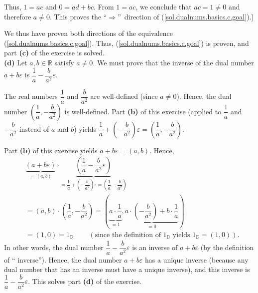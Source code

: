 \documentclass[paper=a4, fontsize=12pt]{scrartcl}%
\theoremstyle{plainsl}
\theoremstyle{definition}
\theoremstyle{remark}
\begin{document}
Thus, $1=ac$ and $0=ad+bc$. From $1=ac$, we conclude that $ac=1\neq0$ and
therefore $a\neq0$. This proves the \textquotedblleft$\Longrightarrow
$\textquotedblright\ direction of (\ref{sol.dualnums.basics.c.goal}).]

We thus have proven both directions of the equivalence
(\ref{sol.dualnums.basics.c.goal}). Thus, (\ref{sol.dualnums.basics.c.goal})
is proven, and part \textbf{(c)} of the exercise is solved.\\[0.4cm]

\textbf{(d)} Let $a,b\in\mathbb{R}$ satisfy $a\neq0$. We must prove that the
inverse of the dual number $a+b\varepsilon$ is $\dfrac{1}{a}-\dfrac{b}{a^{2}%
}\varepsilon$.

The real numbers $\dfrac{1}{a}$ and $\dfrac{b}{a^{2}}$ are well-defined (since
$a\neq0$). Hence, the dual number $\left(  \dfrac{1}{a},-\dfrac{b}{a^{2}%
}\right)  $ is well-defined. Part \textbf{(b)} of this exercise (applied to
$\dfrac{1}{a}$ and $-\dfrac{b}{a^{2}}$ instead of $a$ and $b$) yields
$\dfrac{1}{a}+\left(  -\dfrac{b}{a^{2}}\right)  \varepsilon=\left(  \dfrac
{1}{a},-\dfrac{b}{a^{2}}\right)  $.

Part \textbf{(b)} of this exercise yields $a+b\varepsilon=\left(  a,b\right)
$. Hence,%
\begin{align*}
&  \underbrace{\left(  a+b\varepsilon\right)  }_{=\left(  a,b\right)  }%
\cdot\underbrace{\left(  \dfrac{1}{a}-\dfrac{b}{a^{2}}\varepsilon\right)
}_{=\dfrac{1}{a}+\left(  -\dfrac{b}{a^{2}}\right)  \varepsilon=\left(
\dfrac{1}{a},-\dfrac{b}{a^{2}}\right)  }\\
&  =\left(  a,b\right)  \cdot\left(  \dfrac{1}{a},-\dfrac{b}{a^{2}}\right)
=\left(  \underbrace{a\cdot\dfrac{1}{a}}_{=1},\underbrace{a\cdot\left(
-\dfrac{b}{a^{2}}\right)  +b\cdot\dfrac{1}{a}}_{=0}\right) \\
&  =\left(  1,0\right)  =1_{\mathbb{D}}\ \ \ \ \ \ \ \ \ \ \left(  \text{since
the definition of }1_{\mathbb{D}}\text{ yields }1_{\mathbb{D}}=\left(
1,0\right)  \right)  .
\end{align*}
In other words, the dual number $\dfrac{1}{a}-\dfrac{b}{a^{2}}\varepsilon$ is
an inverse of $a+b\varepsilon$ (by the definition of \textquotedblleft
inverse\textquotedblright). Hence, the dual number $a+b\varepsilon$ has a
unique inverse (because any dual number that has an inverse must have a unique
inverse), and this inverse is $\dfrac{1}{a}-\dfrac{b}{a^{2}}\varepsilon$. This
solves part \textbf{(d)} of the exercise.\\[0.4cm]
\end{document}
